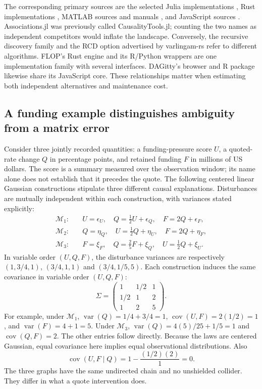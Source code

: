 \endgroup

The corresponding primary sources are the selected Julia implementations
\citep{exec13_other_causalinference,exec13_other_associations,exec13_other_recursive},
Rust implementations
\citep{exec13_other_flopsearch,exec13_other_varlingam,exec13_other_why},
MATLAB sources and manuals
\citep{exec13_other_explorer,exec13_other_generalized,exec13_other_bnt},
and JavaScript sources
\citep{exec13_other_webapp,exec13_other_dagitty}.
Associations.jl was previously called CausalityTools.jl; counting the two names
as independent competitors would inflate the landscape. Conversely, the
recursive discovery family and the RCD option advertised by varlingam-rs
refer to different algorithms. FLOP's Rust engine and its R/Python wrappers
are one implementation family with several interfaces. DAGitty's browser
and R package likewise share its JavaScript core. These relationships matter
when estimating both independent alternatives and maintenance cost.

\subsection{A funding example distinguishes ambiguity from a matrix error}

Consider three jointly recorded quantities: a funding-pressure score $U$, a
quoted-rate change $Q$ in percentage points, and retained funding $F$ in
millions of US dollars. The score is a summary measured over the observation
window; its name alone does not establish that it precedes the quote. The
following centered linear Gaussian constructions stipulate three different
causal explanations. Disturbances are mutually independent within each
construction, with variances stated explicitly:
\begin{align}
\mathcal M_1:\quad &U=\epsilon_U,\quad
 Q=\tfrac12U+\epsilon_Q,\quad F=2Q+\epsilon_F,\\
\mathcal M_2:\quad &Q=\eta_Q,\quad
 U=\tfrac12Q+\eta_U,\quad F=2Q+\eta_F,\\
\mathcal M_3:\quad &F=\xi_F,\quad
 Q=\tfrac25F+\xi_Q,\quad U=\tfrac12Q+\xi_U.
\end{align}
In variable order $(U,Q,F)$, the disturbance variances are respectively
$(1,3/4,1)$, $(3/4,1,1)$ and $(3/4,1/5,5)$.
Each construction induces
the same covariance in variable order $(U,Q,F)$:
\[
 \Sigma=\begin{pmatrix}
 1&1/2&1\\1/2&1&2\\1&2&5
 \end{pmatrix}.
\]
For example, under $\mathcal M_1$, $\operatorname{var}(Q)=1/4+3/4=1$,
$\operatorname{cov}(U,F)=2(1/2)=1$, and
$\operatorname{var}(F)=4+1=5$. Under $\mathcal M_3$,
$\operatorname{var}(Q)=4(5)/25+1/5=1$ and
$\operatorname{cov}(Q,F)=2$. The other entries follow directly.
Because the laws are centered Gaussian, equal covariance here implies equal
observational distributions. Also
\[
 \operatorname{cov}(U,F\mid Q)
 =1-\frac{(1/2)(2)}{1}=0.
\]
The three graphs have the same undirected chain and no unshielded collider.
They differ in what a quote intervention does.

